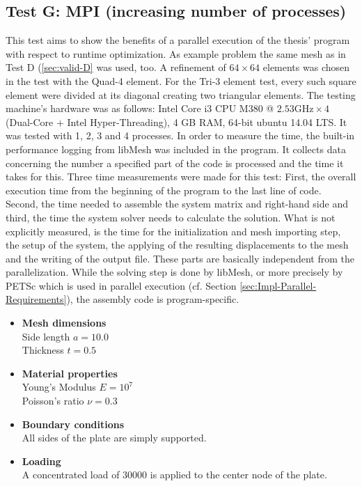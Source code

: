  \subsection{Test G: MPI (increasing number of processes)}\label{sec:valid-G}
  This test aims to show the benefits of a parallel execution of the thesis' program with respect to runtime optimization. As example problem the same mesh as in Test D (\ref{sec:valid-D} was used, too. A refinement of $64\!\times\!64$ elements was chosen in the test with the Quad-4 element. For the Tri-3 element test, every such square element were divided at its diagonal creating two triangular elements. The testing machine's hardware was as follows: Intel Core i3 CPU M380 @ $2.53\text{GHz} \times 4$ (Dual-Core + Intel Hyper-Threading), 4 GB RAM, 64-bit ubuntu 14.04 LTS. It was tested with 1, 2, 3 and 4 processes. In order to measure the time, the built-in performance logging from libMesh was included in the program. It collects data concerning the number a specified part of the code is processed and the time it takes for this. Three time measurements were made for this test: First, the overall execution time from the beginning of the program to the last line of code. Second, the time needed to assemble the system matrix and right-hand side and third, the time the system solver needs to calculate the solution. What is not explicitly measured, is the time for the initialization and mesh importing step, the setup of the system, the applying of the resulting displacements to the mesh and the writing of the output file. These parts are basically independent from the parallelization. While the solving step is done by libMesh, or more precisely by PETSc which is used in parallel execution (cf. Section \ref{sec:Impl-Parallel-Requirements}), the assembly code is program-specific.
  
  \begin{itemize}
   \item \textbf{Mesh dimensions}\\
   Side length $a = 10.0$\\
   Thickness $t = 0.5$
         	
   \item \textbf{Material properties}\\
   Young's Modulus $E = 10^7$\\
   Poisson's ratio $\nu = 0.3$
         	
   \item \textbf{Boundary conditions}\\
   All sides of the plate are simply supported.
        	
   \item \textbf{Loading}\\
   A concentrated load of $30000$ is applied to the center node of the plate.
  \end{itemize}
  
